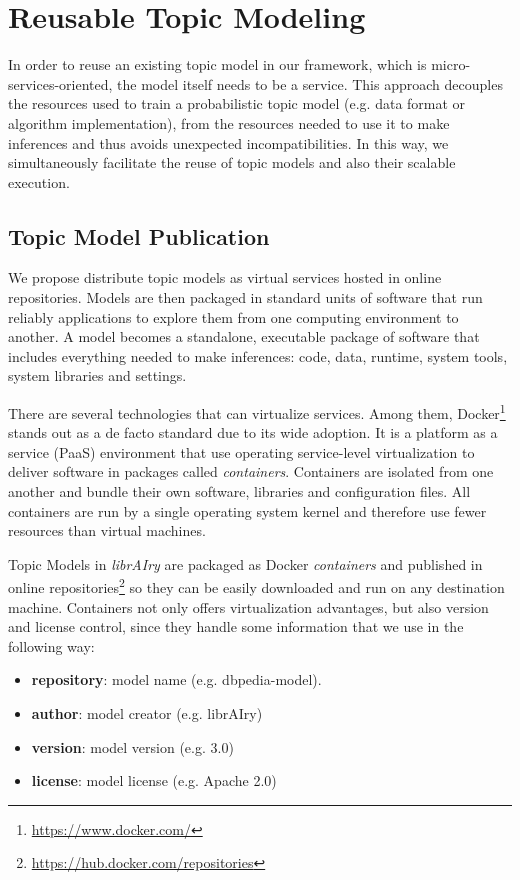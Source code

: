 \section{Reusable Topic Modeling}
\label{sec:reusable-topic-modeling}

In order to reuse an existing topic model in our framework, which is micro-services-oriented, the model itself needs to be a service. This approach decouples the resources used to train a probabilistic topic model (e.g. data format or algorithm implementation), from the resources needed to use it to make inferences and thus avoids unexpected incompatibilities. In this way, we simultaneously facilitate the reuse of topic models and also their scalable execution.

\subsection{Topic Model Publication}
\label{sec:topic-model-publication}

We propose distribute topic models as virtual services hosted in online repositories. Models are then packaged in standard units of software that run reliably applications to explore them from one computing environment to another. A model becomes a standalone, executable package of software that includes everything needed to make inferences: code, data, runtime, system tools, system libraries and settings.

There are several technologies that can virtualize services. Among them, Docker\footnote{\url{https://www.docker.com/}} stands out as a de facto standard due to its wide adoption. It is a platform as a service (PaaS) environment that use operating service-level virtualization to deliver software in packages called \textit{containers}. Containers are isolated from one another and bundle their own software, libraries and configuration files. All containers are run by a single operating system kernel and therefore use fewer resources than virtual machines.

Topic Models in \textit{librAIry} are packaged as Docker \textit{containers} and published in online repositories\footnote{\url{https://hub.docker.com/repositories}} so they can be easily downloaded and run on any destination machine. Containers not only offers virtualization advantages, but also version and license control, since they handle some information that we use in the following way:
\begin{itemize}
\item \textbf{repository}: model name (e.g. dbpedia-model).
\item \textbf{author}: model creator (e.g. librAIry)
\item \textbf{version}: model version (e.g. 3.0)
\item \textbf{license}: model license (e.g. Apache 2.0)
\end{itemize}


